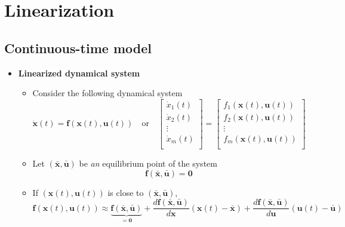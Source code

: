 \documentclass[12pt,a4paper]{article}
\begin{document}
\section{Linearization}

\subsection{Continuous-time model}

\begin{itemize}
\item \textbf{Linearized dynamical system}
  \begin{itemize}
  \item Consider the following dynamical system
    \begin{equation}\label{eq:nlds_continuous}%
      \dot{\bm{x}}(t) = \bm{f}(\bm{x}(t),\bm{u}(t))
      \quad\text{or}\quad
      \begin{bmatrix}
        \dot{x}_{1}(t) \\
        \dot{x}_{2}(t) \\
        \vdots \\
        \dot{x}_{m}(t) \\
      \end{bmatrix}
      = 
      \begin{bmatrix}
        f_{1}(\bm{x}(t),\bm{u}(t)) \\
        f_{2}(\bm{x}(t),\bm{u}(t)) \\
        \vdots \\
        f_{m}(\bm{x}(t),\bm{u}(t)) \\
      \end{bmatrix}
    \end{equation}
  \item Let $(\bar{\bm{x}}, \bar{\bm{u}})$ be \emph{an} equilibrium point of the system
    \begin{equation}\nonumber%
      \bm{f}(\bar{\bm{x}},\bar{\bm{u}}) = \bm{0}
    \end{equation}
  \item If $(\bm{x}(t),\bm{u}(t))$ is close to $(\bar{\bm{x}},\bar{\bm{u}})$,
    \begin{equation}
      \bm{f}(\bm{x}(t),\bm{u}(t))
      \approx
        \underbrace{\bm{f}(\bar{\bm{x}},\bar{\bm{u}})}_{=\bm{0}}
        +
        \frac{d\bm{f}(\bar{\bm{x}},\bar{\bm{u}})}{d\bm{x}}(\bm{x}(t)-\bar{\bm{x}})
        +
        \frac{d\bm{f}(\bar{\bm{x}},\bar{\bm{u}})}{d\bm{u}}(\bm{u}(t)-\bar{\bm{u}})
    \nonumber%
    \end{equation}

\end{itemize}
\end{itemize}
\end{document}
